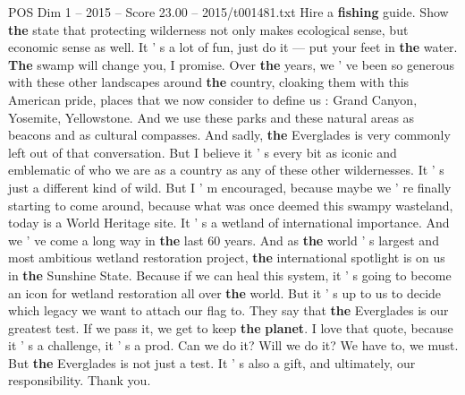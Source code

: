\begin{textsample}{POS Dim 1 – 2015 – Score 23.00 – 2015/t001481.txt}
Hire a \textbf{fishing} guide.
Show \textbf{the} state that protecting wilderness not only makes ecological sense, but economic sense as well.
It ' s a lot of fun, just do it — put your feet in \textbf{the} water. \textbf{The} swamp will change you, I promise.
Over \textbf{the} years, we ' ve been so generous with these other landscapes around \textbf{the} country, cloaking them with this American pride, places that we now consider to define us : Grand Canyon, Yosemite, Yellowstone.
And we use these parks and these natural areas as beacons and as cultural compasses.
And sadly, \textbf{the} Everglades is very commonly left out of that conversation.
But I believe it ' s every bit as iconic and emblematic of who we are as a country as any of these other wildernesses.
It ' s just a different kind of wild.
But I ' m encouraged, because maybe we ' re finally starting to come around, because what was once deemed this swampy wasteland, today is a World Heritage site.
It ' s a wetland of international importance.
And we ' ve come a long way in \textbf{the} last 60 years.
And as \textbf{the} world ' s largest and most ambitious wetland restoration project, \textbf{the} international spotlight is on us in \textbf{the} Sunshine State.
Because if we can heal this system, it ' s going to become an icon for wetland restoration all over \textbf{the} world.
But it ' s up to us to decide which legacy we want to attach our flag to.
They say that \textbf{the} Everglades is our greatest test.
If we pass it, we get to keep \textbf{the} \textbf{planet}.
I love that quote, because it ' s a challenge, it ' s a prod.
Can we do it?
Will we do it?
We have to, we must.
But \textbf{the} Everglades is not just a test.
It ' s also a gift, and ultimately, our responsibility.
Thank you.

\end{textsample}

